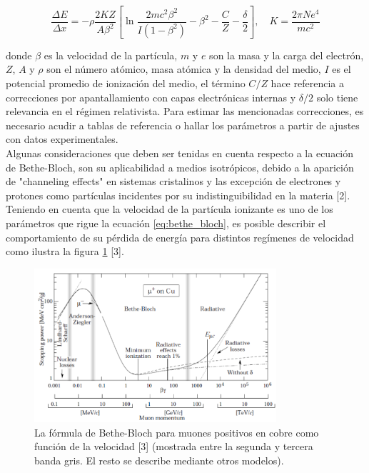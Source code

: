 \documentclass{article}
\begin{document}
\begin{equation}
    \label{eq:bethe_bloch}
    \frac{\Delta E}{\Delta x}=-\rho \frac{2 K Z}{A \beta^2}\left[\ln \frac{2 m c^2 \beta^2}{I\left(1-\beta^2\right)}-\beta^2-\frac{C}{Z}-\frac{\delta}{2}\right], \quad K = \frac{2 \pi N e^{4}}{mc^{2}}
    \end{equation}

\noindent donde $\beta$ es la velocidad de la partícula, $m$ y $e$ son la masa y la carga del electrón, $Z$, $A$ y $\rho$ son el número atómico, masa atómica y la densidad del medio, $I$ es el potencial promedio de ionización del medio, el término $C/Z$ hace referencia a correcciones por apantallamiento con capas electrónicas internas y $\delta /2$ solo tiene relevancia en el régimen relativista. Para estimar las mencionadas correcciones, es necesario acudir a tablas de referencia o hallar los parámetros a partir de ajustes con datos experimentales.\\ 

\noindent Algunas consideraciones que deben ser tenidas en cuenta respecto a la ecuación de Bethe-Bloch, son su aplicabilidad a medios isotrópicos, debido a la aparición de "channeling effects" en sistemas cristalinos y las excepción de electrones y protones como partículas incidentes por su indistinguibilidad en la materia [2].\\

\noindent Teniendo en cuenta que la velocidad de la partícula ionizante es uno de los parámetros que rigue la ecuación \ref{eq:bethe_bloch}, es posible describir el comportamiento de su pérdida de energía para distintos regímenes de velocidad como ilustra la figura \ref{fig:bethe_b} [3].

\begin{figure}[H]
    \centering
    \includegraphics[width=0.8\textwidth]{bethe_bloch.PNG}
    \caption{La fórmula de Bethe-Bloch para muones positivos en cobre como función de la velocidad [3] (mostrada entre la segunda y tercera banda gris. El resto se describe mediante otros modelos).}
    \label{fig:bethe_b}

\end{figure}
\end{document}
